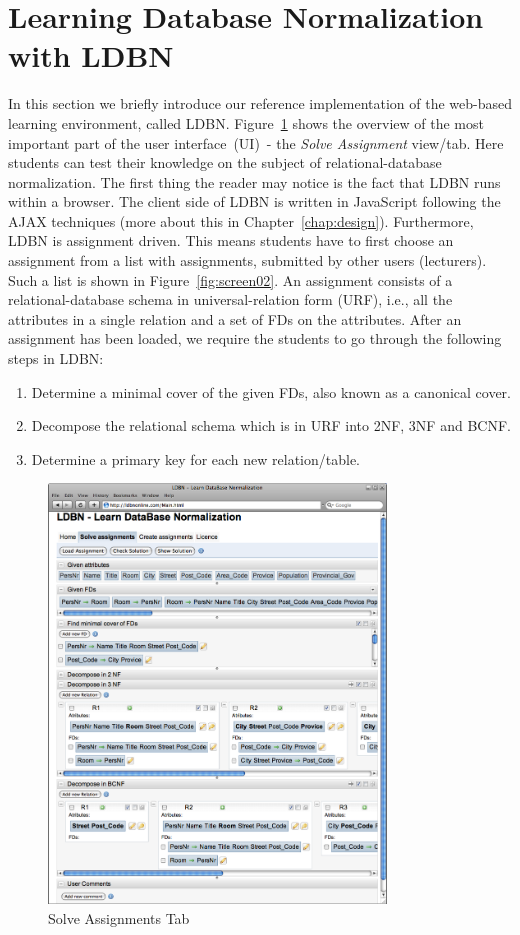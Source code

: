 \section{Learning Database Normalization with LDBN}
\label{sec:introldbn}
In this section we briefly introduce our reference implementation
of the web-based learning environment, called LDBN.    
Figure~\ref{fig:screen01} shows the overview of the most important part of the user interface~(UI)~- 
the \textit{Solve Assignment} view/tab. Here students can test their knowledge on 
the subject of relational-database normalization. The first thing the reader 
may notice is the fact that LDBN runs within a browser. The client side 
of LDBN is written in JavaScript following the AJAX techniques 
(more about this in Chapter~\ref{chap:design}). 
Furthermore, LDBN is assignment driven. This means students have to first 
choose an assignment 
from a list with assignments, submitted by other users (lecturers). 
Such a list is shown in Figure~\ref{fig:screen02}. 
An assignment consists of a relational-database schema in
universal-relation form (URF), i.e., all the attributes in a single relation 
and a set of FDs on the attributes. 
After an assignment has been loaded, we require the students to go through the 
following steps in LDBN:
\begin{enumerate}
	\item Determine a minimal cover of the given FDs, also known as a canonical cover.
	\item Decompose the relational schema which is in URF into 2NF, 3NF and BCNF. 
	\item Determine a primary key for each new relation/table. 
\end{enumerate}

\begin{figure}[h]
	\begin{center}
		\includegraphics[width=0.8\textwidth]{./img/screen01b.png}
		\caption{Solve Assignments Tab}
		\label{fig:screen01}
	\end{center}
\end{figure}

